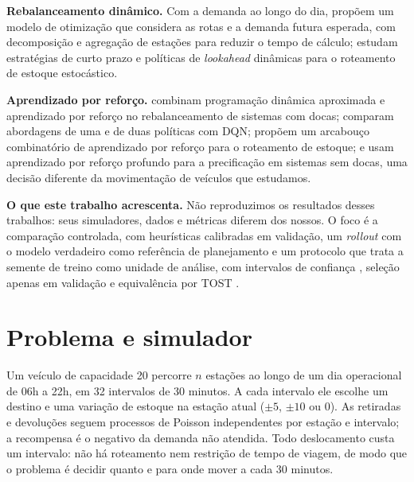 \documentclass[12pt,a4paper]{article}
\begin{document}
\textbf{Rebalanceamento din\^amico.} Com a demanda ao longo do dia, \citet{ghosh2017} prop\~oem um modelo de otimiza\c{c}\~ao que considera as rotas e a demanda
futura esperada, com decomposi\c{c}\~ao e agrega\c{c}\~ao de esta\c{c}\~oes para reduzir o tempo de c\'alculo; \citet{brinkmann2015,brinkmann2019} estudam
estrat\'egias de curto prazo e pol\'iticas de \emph{lookahead} din\^amicas para o roteamento de estoque estoc\'astico.

\textbf{Aprendizado por refor\c{c}o.} \citet{seo2022} combinam programa\c{c}\~ao din\^amica aproximada e aprendizado por refor\c{c}o no rebalanceamento de sistemas com
docas; \citet{liang2024} comparam abordagens de uma e de duas pol\'iticas com DQN; \citet{guo2024} propõem um arcabou\c{c}o combinat\'orio de aprendizado por
refor\c{c}o para o roteamento de estoque; e \citet{pan2019} usam aprendizado por refor\c{c}o profundo para a precifica\c{c}\~ao em sistemas sem docas, uma decis\~ao
diferente da movimenta\c{c}\~ao de ve\'iculos que estudamos.

\textbf{O que este trabalho acrescenta.} N\~ao reproduzimos os resultados desses trabalhos: seus simuladores, dados e m\'etricas diferem dos nossos. O foco \'e a
compara\c{c}\~ao controlada, com heur\'isticas calibradas em valida\c{c}\~ao, um \emph{rollout} \citep{bertsekas1997} com o modelo verdadeiro como refer\^encia de
planejamento e um protocolo que trata a semente de treino como unidade de an\'alise, com intervalos de confian\c{c}a \citep{henderson2018,agarwal2021}, sele\c{c}\~ao apenas
em valida\c{c}\~ao e equival\^encia por TOST \citep{lakens2017}.

\section{Problema e simulador}
Um ve\'iculo de capacidade 20 percorre $n$ esta\c{c}\~oes ao longo de um dia operacional de 06h a 22h, em 32 intervalos de 30 minutos. A cada intervalo ele
escolhe um destino e uma varia\c{c}\~ao de estoque na esta\c{c}\~ao atual ($\pm 5$, $\pm 10$ ou 0). As retiradas e devolu\c{c}\~oes seguem processos de
Poisson independentes por esta\c{c}\~ao e intervalo; a recompensa \'e o negativo da demanda n\~ao atendida. Todo deslocamento custa um intervalo: n\~ao h\'a
roteamento nem restri\c{c}\~ao de tempo de viagem, de modo que o problema \'e decidir quanto e para onde mover a cada 30 minutos.
\end{document}
